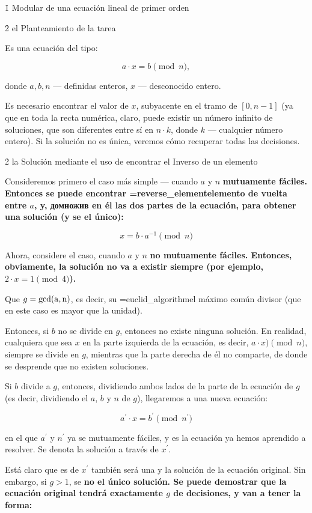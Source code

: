 \h1{ Modular de una ecuación lineal de primer orden }

\h2{ el Planteamiento de la tarea }

Es una ecuación del tipo:

$$a \cdot x = b \pmod n,$$

donde $a, b, n$ --- definidas enteros, $x$ --- desconocido entero.

Es necesario encontrar el valor de $x$, subyacente en el tramo de $[0, n-1]$ (ya que en toda la recta numérica, claro, puede existir un número infinito de soluciones, que son diferentes entre sí en $n \cdot k$, donde $k$ --- cualquier número entero). Si la solución no es única, veremos cómo recuperar todas las decisiones.


\h2{ la Solución mediante el uso de encontrar el Inverso de un elemento }

Consideremos primero el caso más simple --- cuando $a$ y $n$ \bf{mutuamente fáciles}. Entonces se puede encontrar \algohref=reverse_element{elemento de vuelta} entre $a$, y, домножив en él las dos partes de la ecuación, para obtener una solución (y se \bf{el único}):

$$x = b \cdot a^{-1} \pmod n$$

Ahora, considere el caso, cuando $a$ y $n$ \bf{no mutuamente fáciles}. Entonces, obviamente, la solución no va a existir siempre (por ejemplo, $2 \cdot x = 1 \pmod 4$).

Que $g = {\rm gcd(a,n)}$, es decir, su \algohref=euclid_algorithm{el máximo común divisor} (que en este caso es mayor que la unidad).

Entonces, si $b$ no se divide en $g$, entonces no existe ninguna solución. En realidad, cualquiera que sea $x$ en la parte izquierda de la ecuación, es decir, $a \cdot x) \pmod n$, siempre se divide en $g$, mientras que la parte derecha de él no comparte, de donde se desprende que no existen soluciones.

Si $b$ divide a $g$, entonces, dividiendo ambos lados de la parte de la ecuación de $g$ (es decir, dividiendo el $a$, $b$ y $n$ de $g$), llegaremos a una nueva ecuación:

$$a^\prime \cdot x = b^\prime \pmod {n^\prime}$$

en el que $a^\prime$ y $n^\prime$ ya se mutuamente fáciles, y es la ecuación ya hemos aprendido a resolver. Se denota la solución a través de $x^\prime$.

Está claro que es de $x^\prime$ también será una y la solución de la ecuación original. Sin embargo, si $g > 1$, se \bf{no el único} solución. Se puede demostrar que la ecuación original tendrá exactamente $g$ de decisiones, y van a tener la forma:


